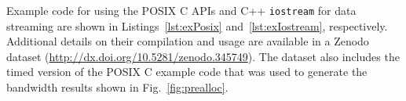 Example code for using the POSIX C APIs and C++ \texttt{iostream} for data
streaming are shown in Listings~\ref{lst:exPosix} and~\ref{lst:exIostream},
respectively.
Additional details on their compilation and usage are available in a
Zenodo~\cite{zenodo} dataset (\url{http://dx.doi.org/10.5281/zenodo.345749}).
The dataset also includes the timed version of the POSIX C example code that was
used to generate the bandwidth results shown in Fig.~\ref{fig:prealloc}.



